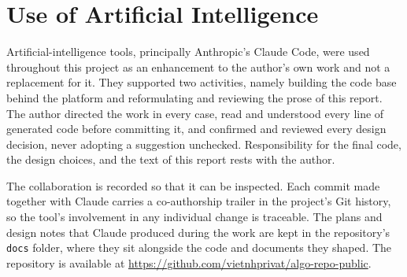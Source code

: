 \section*{Use of Artificial Intelligence}

Artificial-intelligence tools, principally Anthropic's Claude Code, were used
throughout this project as an enhancement to the author's own work and not a
replacement for it. They supported two activities, namely building the code base
behind the platform and reformulating and reviewing the prose of this report.
The author directed the work in every case, read and understood every line of
generated code before committing it, and confirmed and reviewed every design
decision, never adopting a suggestion unchecked. Responsibility for the final
code, the design choices, and the text of this report rests with the author.

The collaboration is recorded so that it can be inspected. Each commit made
together with Claude carries a co-authorship trailer in the project's Git
history, so the tool's involvement in any individual change is traceable. The
plans and design notes that Claude produced during the work are kept in the
repository's \texttt{docs} folder, where they sit alongside the code and
documents they shaped. The repository is available at
\url{https://github.com/vietnhprivat/algo-repo-public}.
